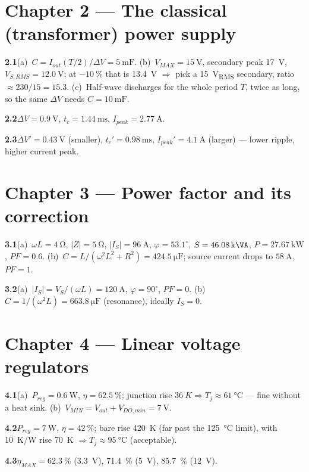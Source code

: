 \documentclass[11pt,a4paper,oneside]{book}
\newcommand{\ans}[1]{\par\smallskip\noindent\textbf{#1}\quad\ignorespaces}
\begin{document}
\section*{Chapter 2 --- The classical (transformer) power supply}
\ans{2.1}(a)~$C=I_{out}(T/2)/\Delta V=\qty{5}{\milli\farad}$.
(b)~$V_{MAX}=\qty{15}{\volt}$, secondary peak \qty{17}{\volt},
$V_{S,RMS}=\qty{12.0}{\volt}$; at $-\qty{10}{\percent}$ that is \qty{13.4}{\volt}
$\Rightarrow$ pick a \qty{15}{\volt_{RMS}} secondary, ratio $\approx230/15=15.3$.
(c)~Half-wave discharges for the whole period $T$, twice as long, so the same
$\Delta V$ needs $C=\qty{10}{\milli\farad}$.
\ans{2.2}$\Delta V=\qty{0.9}{\volt}$, $t_c=\qty{1.44}{\milli\second}$,
$I_{peak}=\qty{2.77}{\ampere}$.
\ans{2.3}$\Delta V'=\qty{0.43}{\volt}$ (smaller), $t_c'=\qty{0.98}{\milli\second}$,
$I_{peak}'=\qty{4.1}{\ampere}$ (larger) --- lower ripple, higher current peak.

\section*{Chapter 3 --- Power factor and its correction}
\ans{3.1}(a)~$\omega L=\qty{4}{\ohm}$, $|Z|=\qty{5}{\ohm}$,
$|I_S|=\qty{96}{\ampere}$, $\varphi=53.1^\circ$, $S=\qty{46.08}{\kilo\VA}$,
$P=\qty{27.67}{\kilo\watt}$, $PF=0.6$.
(b)~$C=L/(\omega^2L^2+R^2)=\qty{424.5}{\micro\farad}$; source current drops to
$\qty{58}{\ampere}$, $PF=1$.
\ans{3.2}(a)~$|I_S|=V_S/(\omega L)=\qty{120}{\ampere}$, $\varphi=90^\circ$,
$PF=0$. (b)~$C=1/(\omega^2L)=\qty{663.8}{\micro\farad}$ (resonance), ideally
$I_S=0$.

\section*{Chapter 4 --- Linear voltage regulators}
\ans{4.1}(a)~$P_{reg}=\qty{0.6}{\watt}$, $\eta=\qty{62.5}{\percent}$; junction
rise $\qty{36}{K}\Rightarrow T_j\approx\qty{61}{\celsius}$ --- fine without a heat
sink. (b)~$V_{MIN}=V_{out}+V_{DO,min}=\qty{7}{\volt}$.
\ans{4.2}$P_{reg}=\qty{7}{\watt}$, $\eta=\qty{42}{\percent}$; bare rise
\qty{420}{K} (far past the \qty{125}{\celsius} limit), with \qty{10}{K/W} rise
\qty{70}{K} $\Rightarrow T_j\approx\qty{95}{\celsius}$ (acceptable).
\ans{4.3}$\eta_{MAX}=\qty{62.3}{\percent}$ (\qty{3.3}{\volt}),
\qty{71.4}{\percent} (\qty{5}{\volt}), \qty{85.7}{\percent} (\qty{12}{\volt}).
\end{document}
